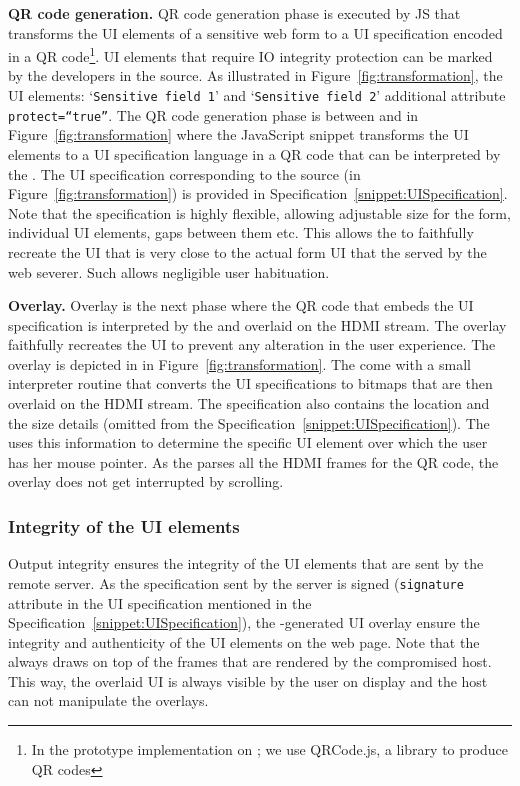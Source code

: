 \begin{mylist}
\item \textbf{QR code generation.} QR code generation phase is executed by \name JS that transforms the UI elements of a sensitive web form to a UI specification encoded in a QR code\footnote{In the prototype implementation on \name; we use QRCode.js, a \js library to produce QR codes}. UI elements that require IO integrity protection can be marked by the developers in the \html source. As illustrated in Figure~\ref{fig:transformation}, the \html UI elements: `\texttt{Sensitive field 1}' and `\texttt{Sensitive field 2}' additional attribute \texttt{protect=``true''}. The QR code generation phase is between \one and \two in Figure~\ref{fig:transformation} where the \name JavaScript snippet transforms the UI elements to a UI specification language in a QR code that can be interpreted by the \device. The UI specification corresponding to the \html source (in Figure~\ref{fig:transformation}) is provided in Specification~\ref{snippet:UISpecification}. Note that the specification is highly flexible, allowing adjustable size for the form, individual UI elements, gaps between them etc. This allows the \device to faithfully recreate the UI that is very close to the actual form UI that the served by the web severer. Such allows negligible user habituation. 

\item \textbf{Overlay.} Overlay is the next phase where the QR code that embeds the UI specification is interpreted by the \device and overlaid on the HDMI stream. The overlay faithfully recreates the UI to prevent any alteration in the user experience. The \device overlay is depicted in \three in Figure~\ref{fig:transformation}. The \device come with a small interpreter routine that converts the UI specifications to bitmaps that are then overlaid on the HDMI stream. The specification also contains the location and the size details (omitted from the Specification~\ref{snippet:UISpecification}). The \device uses this information to determine the specific UI element over which the user has her mouse pointer. As the \device parses all the HDMI frames for the QR code, the overlay does not get interrupted by scrolling.
\end{mylist}

\subsubsection{Integrity of the UI elements} Output integrity ensures the integrity of the UI elements that are sent by the remote server. As the specification sent by the server is signed (\texttt{signature} attribute in the UI specification mentioned in the Specification~\ref{snippet:UISpecification}), the \device-generated UI overlay ensure the integrity and authenticity of the UI elements on the web page. Note that the \device always draws on top of the frames that are rendered by the compromised host. This way, the overlaid UI is always visible by the user on display and the host can not manipulate the overlays.

